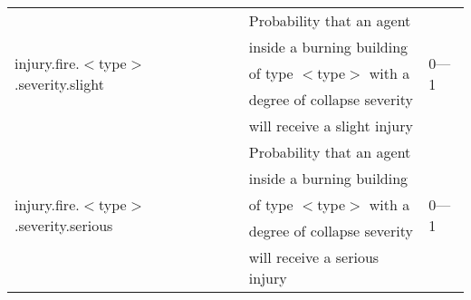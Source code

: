\documentclass{article}
\begin{document}
\begin{table}[htb]
\begin{tabular}{lll}
  \hline
  \multirow{5}{*}{injury.fire.$<$type$>$.severity.slight}   &  Probability that
  an agent                              & \multirow{5}{*}{0---1}\\
                                                            & inside a burning
  building                              & \\
                                                            & of type $<$type$>$
  with a                                & \\
                                                            & degree of collapse
  severity                              & \\
                                                            & will receive a
  slight injury                         & \\
  \hline
  \multirow{5}{*}{injury.fire.$<$type$>$.severity.serious}  &  Probability that
  an agent                              & \multirow{5}{*}{0---1}\\
                                                            & inside a burning
  building                              & \\
                                                            & of type $<$type$>$
  with a                                & \\
                                                            & degree of collapse
  severity                              & \\
                                                            & will receive a
  serious injury                        & \\
  \hline
\end{tabular}
\end{table}
\end{document}
